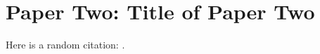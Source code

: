 \chapter{Paper Two: Title of Paper Two}

\begin{refsection}
    \lipsum[5-6]  %
    Here is a random citation: \cite{lipsum2025}.

  \printbibliography[heading=subbibliography, title={References}]
\end{refsection}